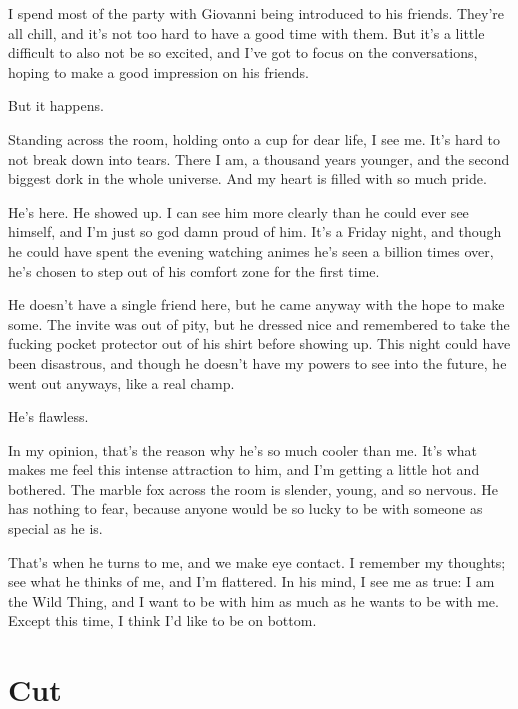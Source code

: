 I spend most of the party with Giovanni being introduced to his friends. They're all chill, and it's not too hard to have a good time with them. But it's a little difficult to also not be so excited, and I've got to focus on the conversations, hoping to make a good impression on his friends.

But it happens.

Standing across the room, holding onto a cup for dear life, I see me. It's hard to not break down into tears. There I am, a thousand years younger, and the second biggest dork in the whole universe. And my heart is filled with so much pride.

He's here. He showed up. I can see him more clearly than he could ever see himself, and I'm just so god damn proud of him. It's a Friday night, and though he could have spent the evening watching animes he's seen a billion times over, he's chosen to step out of his comfort zone for the first time.

He doesn't have a single friend here, but he came anyway with the hope to make some. The invite was out of pity, but he dressed nice and remembered to take the fucking pocket protector out of his shirt before showing up. This night could have been disastrous, and though he doesn't have my powers to see into the future, he went out anyways, like a real champ.

He's flawless.

In my opinion, that's the reason why he's so much cooler than me. It's what makes me feel this intense attraction to him, and I'm getting a little hot and bothered. The marble fox across the room is slender, young, and so nervous. He has nothing to fear, because anyone would be so lucky to be with someone as special as he is.

That's when he turns to me, and we make eye contact. I remember my thoughts; see what he thinks of me, and I'm flattered. In his mind, I see me as true: I am the Wild Thing, and I want to be with him as much as he wants to be with me. Except this time, I think I'd like to be on bottom.

\cleartoverso


\chapter*{Cut}


